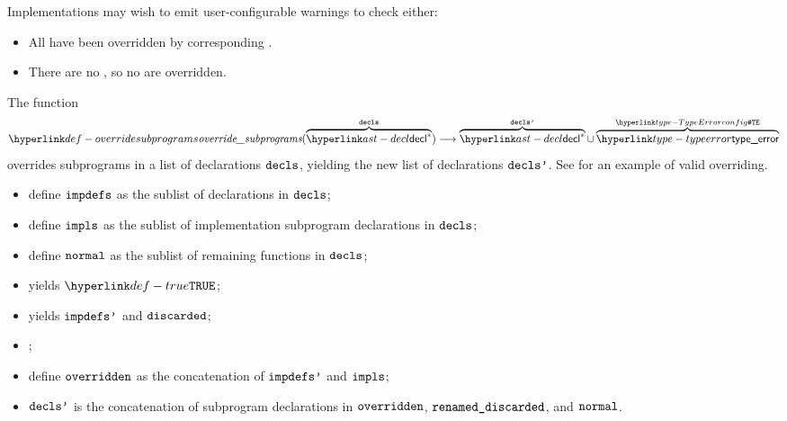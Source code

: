 \noindent
Implementations may wish to emit user-configurable warnings to check either:
\begin{itemize}
  \item All \Proseimpdefsubprograms{} have been overridden by corresponding \Proseimplementationsubprograms{}.
  \item There are no \Proseimplementationsubprograms{}, so no \Proseimpdefsubprograms{} are overridden.
\end{itemize}

\hypertarget{def-overridesubprograms}{}
The function
\[
\overridesubprograms(\overname{\decl^*}{\decls}) \aslto \overname{\decl^*}{\declsp}
\cup \overname{\typeerror}{\TypeErrorConfig}
\]
overrides subprograms in a list of declarations $\texttt{decls}$, yielding the new list of declarations $\texttt{decls'}$.
\ProseOtherwiseTypeError{}
See  for an example of valid overriding.

\ProseParagraph
\AllApply
\begin{itemize}
  \item define $\vimpdefs$ as the sublist of \Proseimpdefsubprogram{} declarations in $\texttt{decls}$;
  \item define $\vimpls$ as the sublist of implementation subprogram declarations in $\texttt{decls}$;
  \item define $\texttt{normal}$ as the sublist of remaining functions in $\texttt{decls}$;
  \item \Prosecheckimplementationsunique{$\vimpls$} yields $\True$\ProseOrTypeError;
  \item \Proseprocessoverrides{$\vimpdefs$}{$\vimpls$} yields $\texttt{impdefs'}$ and $\vdiscarded$\ProseOrTypeError;
  \item \Proserenamesubprograms{$\vdiscarded$}{$\vrenameddiscarded$};
  \item define $\texttt{overridden}$ as the concatenation of $\texttt{impdefs'}$ and $\vimpls$;
  \item $\texttt{decls'}$ is the concatenation of subprogram declarations in $\texttt{overridden}$, $\vrenameddiscarded$, and $\texttt{normal}$.
\end{itemize}

